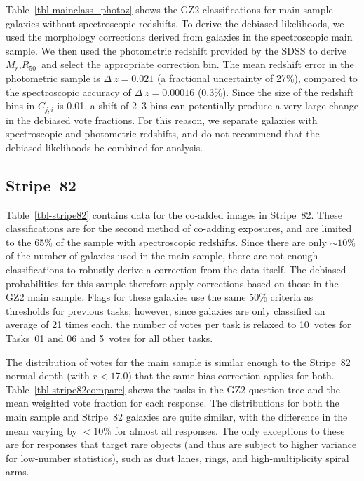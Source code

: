 \documentclass[useAMS,usenatbib]{mn2e}
\newcommand{\mr}{$M_r$}
\newcommand{\rfifty}{$R_{50}$}
\begin{document}
Table~\ref{tbl-mainclass_photoz} shows the GZ2 classifications for main sample galaxies without spectroscopic redshifts. To derive the debiased likelihoods, we used the morphology corrections derived from galaxies in the spectroscopic main sample. We then used the photometric redshift provided by the SDSS to derive \mr,\rfifty~and select the appropriate correction bin. The mean redshift error in the photometric sample is $\Delta~z=0.021$ (a fractional uncertainty of 27\%), compared to the spectroscopic accuracy of $\Delta~z=0.00016$ (0.3\%). Since the size of the redshift bins in $C_{j,i}$ is 0.01, a shift of 2--3 bins can potentially produce a very large change in the debiased vote fractions. For this reason, we separate galaxies with spectroscopic and photometric redshifts, and do not recommend that the debiased likelihoods be combined for analysis. 


\subsection{Stripe~82}\label{ssec-s82}

Table~\ref{tbl-stripe82} contains data for the co-added images in Stripe~82. These classifications are for the second method of co-adding exposures, and are limited to the 65\% of the sample with spectroscopic redshifts. Since there are only $\sim10\%$ of the number of galaxies used in the main sample, there are not enough classifications to robustly derive a correction from the data itself. The debiased probabilities for this sample therefore apply corrections based on those in the GZ2 main sample. Flags for these galaxies use the same 50\% criteria as thresholds for previous tasks; however, since galaxies are only classified an average of 21 times each, the number of votes per task is relaxed to 10~votes for Tasks~01 and 06 and 5~votes for all other tasks. 

The distribution of votes for the main sample is similar enough to the Stripe~82 normal-depth (with $r<17.0$) that the same bias correction applies for both. Table~\ref{tbl-stripe82compare} shows the tasks in the GZ2 question tree and the mean weighted vote fraction for each response. The distributions for both the main sample and Stripe~82 galaxies are quite similar, with the difference in the mean varying by $<10\%$ for almost all responses. The only exceptions to these are for responses that target rare objects (and thus are subject to higher variance for low-number statistics), such as dust lanes, rings, and high-multiplicity spiral arms. 
\end{document}
